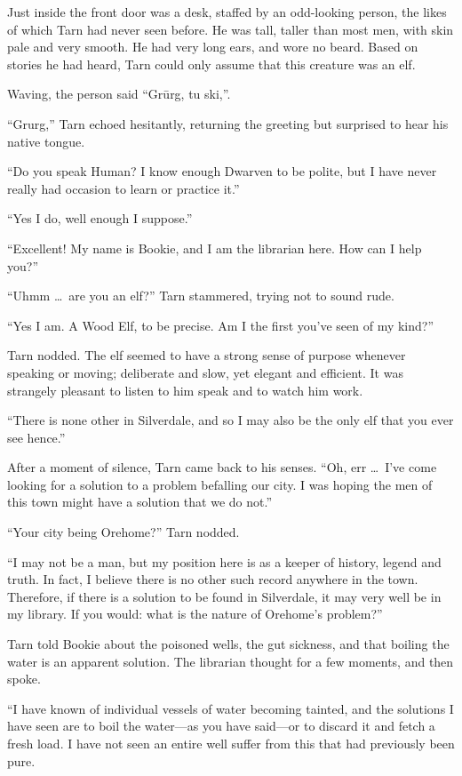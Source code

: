 Just inside the front door was a desk, staffed by an odd-looking person, the likes of which Tarn had never seen before.  He was tall, taller than most men, with skin pale and very smooth.  He had very long ears, and wore no beard.  Based on stories he had heard, Tarn could only assume that this creature was an elf.

Waving, the person said ``Gr\=urg, tu ski,''.

``Grurg,'' Tarn echoed hesitantly, returning the greeting but surprised to hear his native tongue.

``Do you speak Human?  I know enough Dwarven to be polite, but I have never really had occasion to learn or practice it.''

``Yes I do, well enough I suppose.''

``Excellent!  My name is Bookie, and I am the librarian here.  How can I help you?''

``Uhmm \ldots\ are you an elf?'' Tarn stammered, trying not to sound rude.

``Yes I am.  A Wood Elf, to be precise.  Am I the first you've seen of my kind?''

Tarn nodded.  The elf seemed to have a strong sense of purpose whenever speaking or moving; deliberate and slow, yet elegant and efficient.  It was strangely pleasant to listen to him speak and to watch him work.

``There is none other in Silverdale, and so I may also be the only elf that you ever see hence.''

After a moment of silence, Tarn came back to his senses.  ``Oh, err \ldots\ I've come looking for a solution to a problem befalling our city.  I was hoping the men of this town might have a solution that we do not.''

``Your city being Orehome?''  Tarn nodded.

``I may not be a man, but my position here is as a keeper of history, legend and truth.  In fact, I believe there is no other such record anywhere in the town.  Therefore, if there is a solution to be found in Silverdale, it may very well be in my library. If you would: what is the nature of Orehome's problem?''

Tarn told Bookie about the poisoned wells, the gut sickness, and that boiling the water is an apparent solution.  The librarian thought for a few moments, and then spoke.

``I have known of individual vessels of water becoming tainted, and the solutions I have seen are to boil the water---as you have said---or to discard it and fetch a fresh load.  I have not seen an entire well suffer from this that had previously been pure.

